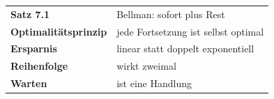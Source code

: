 \begin{merksatz}
\begin{center}
\renewcommand{\arraystretch}{1.5}
\begin{tabular}{@{}P{3.6cm}P{5.0cm}@{}}
\toprule
\textbf{Satz 7.1} & Bellman: sofort plus Rest\\
\textbf{Optimalitäts\-prinzip} & jede Fortsetzung ist selbst optimal\\
\textbf{Ersparnis} & linear statt doppelt exponentiell\\
\textbf{Reihenfolge} & wirkt zweimal\\
\textbf{Warten} & ist eine Handlung\\
\bottomrule
\end{tabular}
\end{center}

\begin{center}
\begin{minipage}{0.88\textwidth}
\end{minipage}
\end{center}
\end{merksatz}

